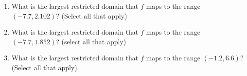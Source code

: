 \documentclass{ximera}
\begin{document}
\begin{exercise}
\begin{enumerate}
\begin{selectAll}
          \end{selectAll}
        \item What is the largest restricted domain that $ f $ maps to the range $ (-7.7, 2.102) $?  (Select all that apply)
          \begin{multipleChoice}
          \end{multipleChoice}
        \item What is the largest restricted domain that $ f $ maps to the range $ (-7.7, 1.852) $?  (select all that apply)
          \begin{multipleChoice}
          \end{multipleChoice}
        \item What is the largest restricted domain that $ f $ maps to the range $ (-1.2, 6.6) $?  (Select all that apply)
        \begin{multipleChoice}
        \end{multipleChoice}
   \end{enumerate}
 \end{exercise}
\end{document}
